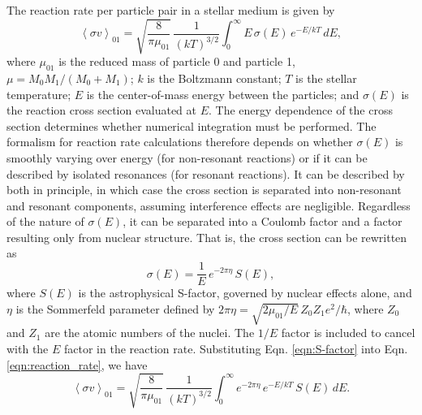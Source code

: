 The reaction rate per particle pair in a stellar medium is given by
\begin{equation} \label{eqn:reaction_rate}
\left\langle \sigma v \right\rangle_{01} = \sqrt{\frac{8}{\pi \mu_{01}}} \, \frac{1}{(kT)^{3/2}} \int_{0}^{\infty} E \, \sigma(E) \, e^{-E/kT} \, dE,
\end{equation}
where $\mu_{01}$ is the reduced mass of particle 0 and particle 1, $\mu = M_{0}M_{1}/(M_{0}+M_{1})$; $k$ is the Boltzmann constant; $T$ is the stellar temperature; $E$ is the center-of-mass energy between the particles; and $\sigma(E)$ is the reaction cross section evaluated at $E$. The energy dependence of the cross section determines whether numerical integration must be performed. The formalism for reaction rate calculations therefore depends on whether $\sigma(E)$ is smoothly varying over energy (for non-resonant reactions) or if it can be described by isolated resonances (for resonant reactions). It can be described by both in principle, in which case the cross section is separated into non-resonant and resonant components, assuming interference effects are negligible. Regardless of the nature of $\sigma(E)$, it can be separated into a Coulomb factor and a factor resulting only from nuclear structure. That is, the cross section can be rewritten as
\begin{equation} \label{eqn:S-factor}
\sigma(E) = \frac{1}{E} \, e^{-2 \pi \eta} \, S(E),
\end{equation}
where $S(E)$ is the astrophysical S-factor, governed by nuclear effects alone, and $\eta$ is the Sommerfeld parameter defined by $2 \pi \eta = \sqrt{2 \mu_{01} / E} \,  Z_{0} Z_{1} e^{2} / \hbar$, where $Z_{0}$ and $Z_{1}$ are the atomic numbers of the nuclei. The $1/E$ factor is included to cancel with the $E$ factor in the reaction rate. Substituting Eqn. \ref{eqn:S-factor} into Eqn. \ref{eqn:reaction_rate}, we have
\begin{equation} \label{eqn:reaction_rate_S-factor}
\left\langle \sigma v \right\rangle_{01} = \sqrt{\frac{8}{\pi \mu_{01}}} \, \frac{1}{(kT)^{3/2}} \int_{0}^{\infty} e^{-2 \pi \eta} \, e^{-E/kT} \, S(E) \, dE.
\end{equation}

